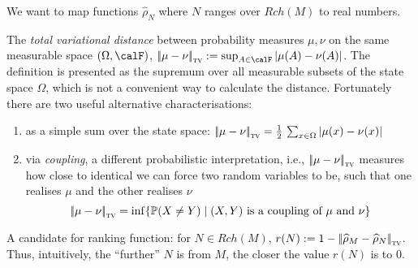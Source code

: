 We want to map functions $\widehat{\rho}_N$ where $N$ ranges over $\mathit{Rch}(M)$ to real numbers.

The \emph{total variational distance} between probability measures $\mu, \nu$ on the same measurable space $(\Omega, \calF)$, $\tvdist{\mu - \nu} := \sup_{A \in \calF} |\mu(A) - \nu(A)|$.
The definition is presented as the supremum over all measurable subsets of the state space $\Omega$, which is not a convenient way to calculate the distance.
Fortunately there are two useful alternative characterisations:
\begin{enumerate}
\item as a simple sum over the state space: ${|\!|}\mu - \nu{|\!|}_{\textsc{tv}} = \frac{1}{2} \, \sum_{x \in \Omega} |\mu(x) - \nu(x)|$
\item via \emph{coupling}, a different probabilistic interpretation, i.e., ${|\!|}\mu - \nu{|\!|}_{\textsc{tv}}$ measures how close to identical we can force two random variables to be, such that one realises $\mu$ and the other realises $\nu$
\[
{|\!|}\mu - \nu{|\!|}_{\textsc{tv}} = \inf \{\mathbb{P}(X \not= Y) \mid \hbox{$(X, Y)$ is a coupling of $\mu$ and $\nu$}\}
\]
\end{enumerate}


A candidate for ranking function: for $N \in \mathit{Rch}(M)$, $r(N) := 1 - {|\!|}\widehat{\rho}_M - \widehat{\rho}_N{|\!|}_{\textsc{tv}}$. 
Thus, intuitively, the ``further'' $N$ is from $M$, the closer the value $r(N)$ is to 0.


